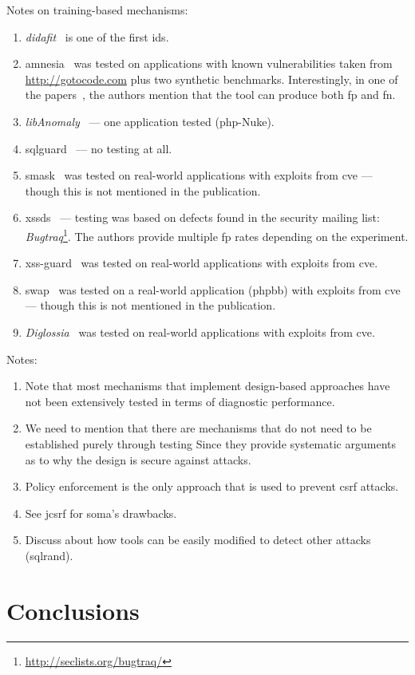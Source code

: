 \documentclass[conference]{IEEEtran}
\begin{document}
Notes on training-based mechanisms:
\begin{enumerate}
\item {\it {\sc didafit}}~\cite{LLW02} is one of
the first {\sc ids}.
\item {\sc amnesia}~\cite{HO05,HO06,HO05b} was tested
on applications with known vulnerabilities taken
from \url{http://gotocode.com} plus two synthetic benchmarks.
Interestingly, in one of the papers~\cite{HO06},
the authors mention that the tool can produce both {\sc fp} and
{\sc fn}.
\item {\it libAnomaly}~\cite{VMV05} --- one application tested ({\sc php}-Nuke).
\item {\sc sqlg}uard~\cite{BWS05} --- no testing at all.
\item {\sc sm}ask~\cite{JB07} was tested on real-world applications
with exploits from {\sc cve} --- though this is not mentioned in the publication.
\item {\sc xssds}~\cite{JEP08} --- testing was based on 
defects found in the security mailing
list: {\it Bugtraq}\footnote{\url{http://seclists.org/bugtraq/}}.
The authors provide multiple {\sc fp} rates depending on the experiment.
\item {\sc xss-guard}~\cite{BV08} was tested on real-world applications
with exploits from {\sc cve}.
\item {\sc swap}~\cite{WPLKK09} was tested on a real-world application ({\sc phpbb})
with exploits from {\sc cve} --- though this is not mentioned in the publication.
\item {\it Diglossia}~\cite{SMS13} was tested on real-world applications
with exploits from {\sc cve}.
\end{enumerate}

Notes:
\begin{enumerate}
\item Note that most mechanisms that implement design-based
approaches have not been extensively tested in terms of
diagnostic performance.
\item We need to mention that there are mechanisms that
do not need to be established purely through testing
Since they provide systematic arguments as to why
the design is secure against attacks.
\item Policy enforcement is the
only approach that is
used to prevent {\sc csrf} attacks.
\item See j{\sc csrf} for {\sc soma}'s drawbacks.
\item Discuss about how tools can be easily modified
to detect other attacks ({\sc sql}rand).
\end{enumerate}

\section{Conclusions}




\end{document}
